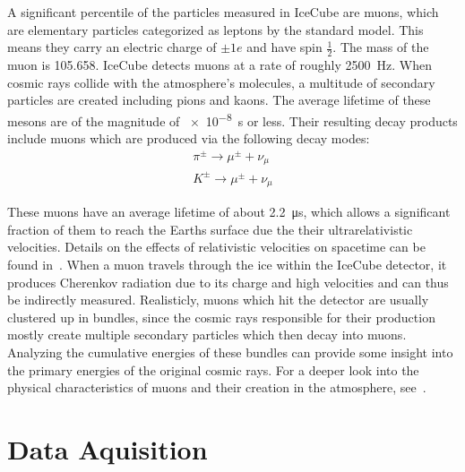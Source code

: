A significant percentile of the particles measured in IceCube are muons, which are elementary particles categorized as leptons by the standard model.
This means they carry an electric charge of $\pm 1e$ and have spin $\frac{1}{2}$. The mass of the muon is \num{105.658}. IceCube detects
muons at a rate of roughly \SI{2500}{Hz}. When cosmic rays collide with the atmosphere's molecules, a multitude of secondary particles are created including 
pions and kaons. The average lifetime of these mesons are of the magnitude of \SI{e-8}{s} or less. Their resulting decay products include muons which are 
produced via the following decay modes:\\

\begin{align}
    \pi^\pm \to \mu^\pm + \nu_\mu \\
    K^\pm \to \mu^\pm + \nu_\mu
\end{align}

These muons have an average lifetime of about \SI{2.2}{\micro\second}, which allows a significant fraction of them to reach the Earths surface due the their 
ultrarelativistic velocities. Details on the effects of relativistic velocities on spacetime can be found in~\cite{einstein}. When a muon travels through the ice 
within the IceCube detector, it produces Cherenkov radiation due to its charge and high velocities and 
can thus be indirectly measured. Realisticly, muons which hit the detector are usually clustered up in bundles, since the cosmic rays responsible for their production
mostly create multiple secondary particles which then decay into muons. Analyzing the cumulative energies of these bundles can provide some insight into the primary 
energies of the original cosmic rays. For a deeper look into the physical characteristics of muons and their creation in the atmosphere, see~\cite{einstein}.


\section{Data Aquisition}\label{sec:daq}

